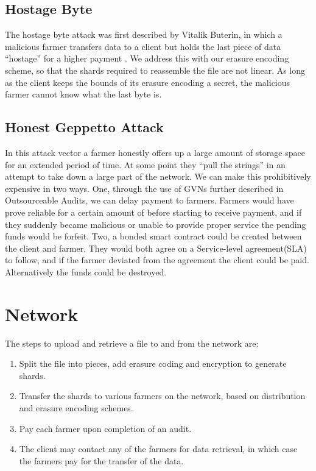 \documentclass[a4paper,10pt]{article}
\begin{document}
\subsection{Hostage Byte}
The hostage byte attack was first described by Vitalik Buterin, in which a malicious farmer transfers data to a client but holds the last piece of data “hostage” for a higher payment \cite{16}. We address this with our erasure encoding scheme, so that the shards required to reassemble the file are not linear. As long as the client keeps the bounds of its erasure encoding a secret, the malicious farmer cannot know what the last byte is.

\subsection{Honest Geppetto Attack}
In this attack vector a farmer honestly offers up a large amount of storage space for an extended period of time. At some point they “pull the strings” in an attempt to take down a large part of the network. We can make this prohibitively expensive in two ways. One, through the use of GVNs further described in Outsourceable Audits, we can delay payment to farmers. Farmers would have prove reliable for a certain amount of before starting to receive payment, and if they suddenly became malicious or unable to provide proper service the pending funds would be forfeit. Two, a bonded smart contract could be created between the client and farmer. They would both agree on a Service-level agreement(SLA) to follow, and if the farmer deviated from the agreement the client could be paid. Alternatively the funds could be destroyed.

\section{Network}
The steps to upload and retrieve a file to and from the network are:
\begin{enumerate}
\item Split the file into pieces, add erasure coding and encryption to generate shards.
\item Transfer the shards to various farmers on the network, based on distribution and erasure encoding schemes.
\item Pay each farmer upon completion of an audit.
\item The client may contact any of the farmers for data retrieval, in which case the farmers pay for the transfer of the data.
\end{enumerate}
\end{document}
